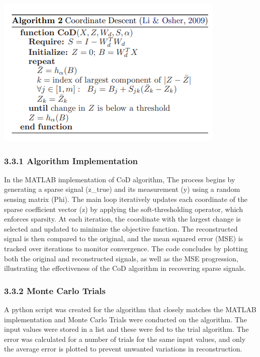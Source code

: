 \documentclass[
  letterpaper,
  DIV=11,
  numbers=noendperiod]{scrartcl}
\begin{document}
\begin{center}
\includegraphics[width=0.8\linewidth,height=\textheight,keepaspectratio]{abar-cs_files/mediabag/algorithm_cod.png}
\end{center}

\subsubsection{3.3.1 Algorithm
Implementation}\label{algorithm-implementation-1}

In the MATLAB implementation of CoD algorithm, The process begins by
generating a sparse signal (z\_true) and its measurement (y) using a
random sensing matrix (Phi). The main loop iteratively updates each
coordinate of the sparse coefficient vector (z) by applying the
soft-thresholding operator, which enforces sparsity. At each iteration,
the coordinate with the largest change is selected and updated to
minimize the objective function. The reconstructed signal is then
compared to the original, and the mean squared error (MSE) is tracked
over iterations to monitor convergence. The code concludes by plotting
both the original and reconstructed signals, as well as the MSE
progression, illustrating the effectiveness of the CoD algorithm in
recovering sparse signals.

\subsubsection{3.3.2 Monte Carlo Trials}\label{monte-carlo-trials-1}

A python script was created for the algorithm that closely matches the
MATLAB implementation and Monte Carlo Trials were conducted on the
algorithm. The input values were stored in a list and these were fed to
the trial algorithm. The error was calculated for a number of trials for
the same input values, and only the average error is plotted to prevent
unwanted variations in reconstruction.
\end{document}
